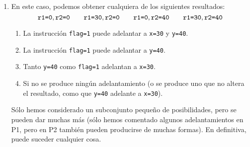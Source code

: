 \begin{ejercicio}
\begin{enumerate}
    \item En este caso, podemos obtener cualquiera de los siguientes resultados:
        \begin{equation*}
            \verb|r1=0|, \verb|r2=0| \qquad \verb|r1=30|, \verb|r2=0| \qquad \verb|r1=0|, \verb|r2=40| \qquad \verb|r1=30|, \verb|r2=40|
        \end{equation*}
        \begin{enumerate}
            \item La instrucción \verb|flag=1| puede adelantar a \verb|x=30| y \verb|y=40|.
            \item La instrucción \verb|flag=1| puede adelantar a \verb|y=40|.
            \item Tanto \verb|y=40| como \verb|flag=1| adelantan a \verb|x=30|.
            \item Si no se produce ningún adelantamiento (o se produce uno que no altera el resultado, como que \verb|y=40| adelante a \verb|x=30|).
        \end{enumerate}
        Sólo hemos considerado un subconjunto pequeño de posibilidades, pero se pueden dar muchas más (sólo hemos comentado algunos adelantamientos en P1, pero en P2 también pueden producirse de muchas formas). En definitiva, puede suceder cualquier cosa.
\end{enumerate}

\end{ejercicio}

